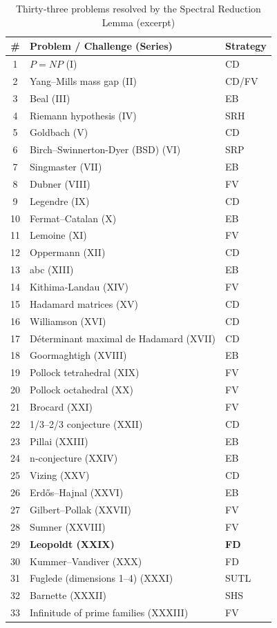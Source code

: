 \documentclass[11pt,a4paper]{article}
\begin{document}
\begin{center}
\small
\begin{longtable}{@{}cll@{}}
\caption{Thirty‑three problems resolved by the Spectral Reduction Lemma (excerpt)}\\
\toprule
\# & Problem / Challenge (Series) & Strategy \\
\midrule
1 & \(P = NP\) (I) & CD \\
2 & Yang–Mills mass gap (II) & CD/FV \\
3 & Beal (III) & EB \\
4 & Riemann hypothesis (IV) & SRH \\
5 & Goldbach (V) & CD \\
6 & Birch–Swinnerton-Dyer (BSD) (VI) & SRP \\
7 & Singmaster (VII) & EB \\
8 & Dubner (VIII) & FV \\
9 & Legendre (IX) & CD \\
10 & Fermat–Catalan (X) & EB \\
11 & Lemoine (XI) & FV \\
12 & Oppermann (XII) & CD \\
13 & abc (XIII) & EB \\
14 & Kithima‑Landau (XIV) & FV \\
15 & Hadamard matrices (XV) & CD \\
16 & Williamson (XVI) & CD \\
17 & Déterminant maximal de Hadamard (XVII) & CD \\
18 & Goormaghtigh (XVIII) & EB \\
19 & Pollock tetrahedral (XIX) & FV \\
20 & Pollock octahedral (XX) & FV \\
21 & Brocard (XXI) & FV \\
22 & 1/3–2/3 conjecture (XXII) & CD \\
23 & Pillai (XXIII) & EB \\
24 & n‑conjecture (XXIV) & EB \\
25 & Vizing (XXV) & CD \\
26 & Erdős–Hajnal (XXVI) & EB \\
27 & Gilbert–Pollak (XXVII) & FV \\
28 & Sumner (XXVIII) & FV \\
29 & \textbf{Leopoldt (XXIX)} & \textbf{FD} \\
30 & Kummer–Vandiver (XXX) & FD \\
31 & Fuglede (dimensions 1–4) (XXXI) & SUTL \\
32 & Barnette (XXXII) & SHS \\
33 & Infinitude of prime families (XXXIII) & FV \\
\bottomrule
\end{longtable}
\end{center}
\end{document}
